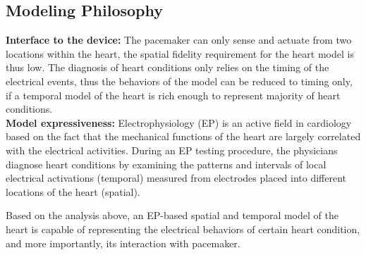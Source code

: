 \documentclass[openany]{now} %
\begin{document}
\subsection{Modeling Philosophy}

\textbf{Interface to the device: }The pacemaker can only sense and actuate from two locations within the heart, the spatial fidelity requirement for the heart model is thus low. The diagnosis of heart conditions only relies on the timing of the electrical events, thus the behaviors of the model can be reduced to timing only, if a temporal model of the heart is rich enough to represent majority of heart conditions. \\
\textbf{Model expressiveness: }Electrophysiology (EP) is an active field in cardiology based on the fact that the mechanical functions of the heart are largely correlated with the electrical activities. During an EP testing procedure, the physicians diagnose heart conditions by examining the patterns and intervals of local electrical activations (temporal) measured from electrodes placed into different locations of the heart (spatial). 

Based on the analysis above, an EP-based spatial and temporal model of the heart is capable of representing the electrical behaviors of certain heart condition, and more importantly, its interaction with pacemaker. 
\end{document}
